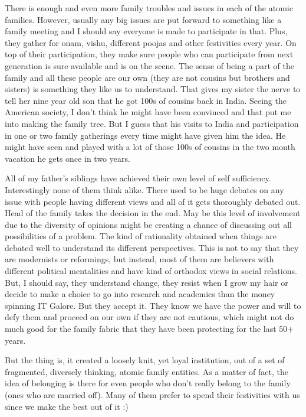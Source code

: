 There is enough and even more family troubles and issues in each of the atomic families. However, usually any 
big issues are put forward to something like a family meeting and I should say everyone is made 
to participate in that. Plus, they gather for onam, vishu, different poojas and other festivities 
every year. On top of their participation, they make sure people who can participate from next
generation is sure available and is on the scene. The sense of being a part of the family and all these 
people are our own (they are not cousins but brothers and sisters) is something they like us to
understand. That gives my sister the nerve to tell her nine year old son that he got 100s of 
cousins back in India. Seeing the American society, I don't think he might have been convinced 
and that put me into making the family tree. But I guess that his visits to India and participation in one or 
two family gatherings every time might have given him the idea. He might have seen and 
played with a lot of those 100s of cousins in the two month vacation he gets once in two years. 

All of my father's siblings have achieved their own level of self sufficiency. Interestingly none of 
them think alike. There used to be huge debates on any issue with people having different views and all of it gets
thoroughly debated out. Head of the family takes the decision in the end. May be this level of
involvement due to the diversity of opinions might be creating a chance of discussing out all 
possibilities of a problem. The kind of rationality obtained when things are debated well to 
understand its different perspectives. This is not to say that they are modernists or reformings, but instead, most 
of them are believers with different political mentalities and have kind of orthodox views in 
social relations. But, I should say, they understand change, they resist when I grow my hair or 
decide to make a choice to go into research and academics than the money spinning IT Galore. 
But they accept it. They know we have the power and will to defy them and proceed on our own 
if they are not cautious, which might not do much good for the family fabric that they have been protecting 
for the last 50+ years.

But the thing is, it created a loosely knit, yet loyal institution, out of a set of fragmented, diversely
thinking, atomic family entities. As a matter of fact, the idea of belonging is there for even people who don't really 
belong to the family (ones who are married off). Many of them prefer to spend their
festivities with us since we make the best out of it :) 

